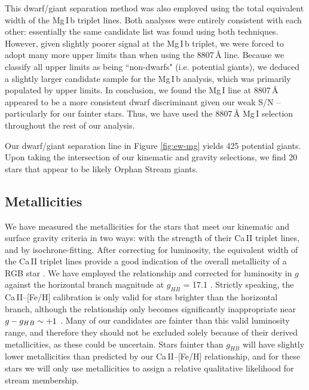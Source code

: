 \documentclass[10pt,apjl]{emulateapj}
\begin{document}
This dwarf/giant separation method was also employed using the total equivalent width of the Mg\,\textsc{I}\,b triplet lines. Both analyses were entirely consistent with each other: essentially the same candidate list was found using both techniques. However, given slightly poorer signal at the Mg\,\textsc{I}\,b triplet, we were forced to adopt many more upper limits than when using the 8807\,{\AA} line. Because we classify all upper limits as being ``non-dwarfs" (i.e. potential giants), we deduced a slightly larger candidate sample for the Mg\,\textsc{I}\,b analysis, which was primarily populated by upper limits. In conclusion, we found the Mg\,\textsc{I} line at 8807\,{\AA} appeared to be a more consistent dwarf discriminant given our weak S/N \--- particularly for our fainter stars. Thus, we have used the 8807\,{\AA} Mg\,\textsc{I} selection throughout the rest of our analysis.

Our dwarf/giant separation line in Figure \ref{fig:ew-mg} yields 425 potential giants. Upon taking the intersection of our kinematic and gravity selections, we find 20 stars that appear to be likely Orphan Stream giants.


\subsection{Metallicities}
\label{sec:metallicities}

We have measured the metallicities for the stars that meet our kinematic and surface gravity criteria in two ways: with the strength of their Ca\,\textsc{II} triplet lines, and by isochrone-fitting. After correcting for luminosity, the equivalent width of the Ca\,\textsc{II} triplet lines provide a good indication of the overall metallicity of a RGB star \citep{Amandroff_Da_Costa_1991}. We have employed the \citet{Starkenburg_et-al_2010} relationship and corrected for luminosity in $g$ against the horizontal branch magnitude at $g_{HB}$ = 17.1 \citep{Newberg_et-al_2010}. Strictly speaking, the Ca\,\textsc{II}\---[Fe/H] calibration is only valid for stars brighter than the horizontal branch, although the relationship only becomes significantly inappropriate near $g \-- g_{HB} \sim +1$ \citep{Saviane_et-al_2012}. Many of our candidates are fainter than this valid luminosity range, and therefore they should not be excluded solely because of their derived metallicities, as these could be uncertain. Stars fainter than $g_{HB}$ will have slightly lower metallicities than predicted by our Ca\,\textsc{II}\---[Fe/H] relationship, and for these stars we will only use metallicities to assign a relative qualitative likelihood for stream membership.
\end{document}
